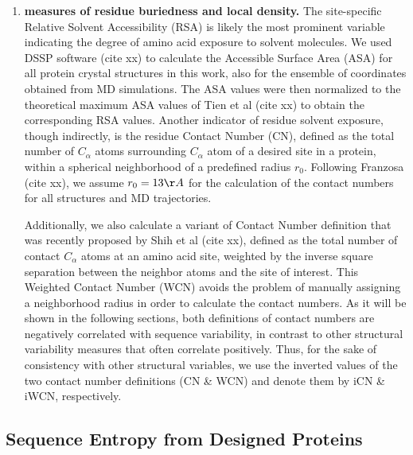 \documentclass[preprint,12pt]{article}
\begin{document}
\begin{enumerate}

            \item {\bf measures of residue buriedness and local density.}
                The site-specific Relative Solvent Accessibility (RSA) is likely the most prominent variable indicating the degree of amino acid exposure to solvent molecules. We used DSSP software (cite xx) to calculate the Accessible Surface Area (ASA) for all protein crystal structures in this work, also for the ensemble of coordinates obtained from MD simulations. The ASA values were then normalized to the theoretical maximum ASA values of Tien et al (cite xx) to obtain the corresponding RSA values. Another indicator of residue solvent exposure, though indirectly, is the residue Contact Number (CN), defined as the total number of $C_\alpha$ atoms surrounding $C_\alpha$ atom of a desired site in a protein, within a spherical neighborhood of a predefined radius $r_0$. Following Franzosa (cite xx), we assume $r_0=13\AA$ for the calculation of the contact numbers for all structures and MD trajectories.

                Additionally, we also calculate a variant of Contact Number definition that was recently proposed by Shih et al (cite xx), defined as the total number of contact $C_\alpha$ atoms at an amino acid site, weighted by the inverse square separation between the neighbor atoms and the site of interest. This Weighted Contact Number (WCN) avoids the problem of manually assigning a neighborhood radius in order to calculate the contact numbers. As it will be shown in the following sections, both definitions of contact numbers are negatively correlated with sequence variability, in contrast to other structural variability measures that often correlate positively. Thus, for the sake of consistency with other structural variables, we use the inverted values of the two contact number definitions (CN \& WCN) and denote them by iCN \& iWCN, respectively.

        \end{enumerate}

    \subsection{Sequence Entropy from Designed Proteins}
\end{document}
